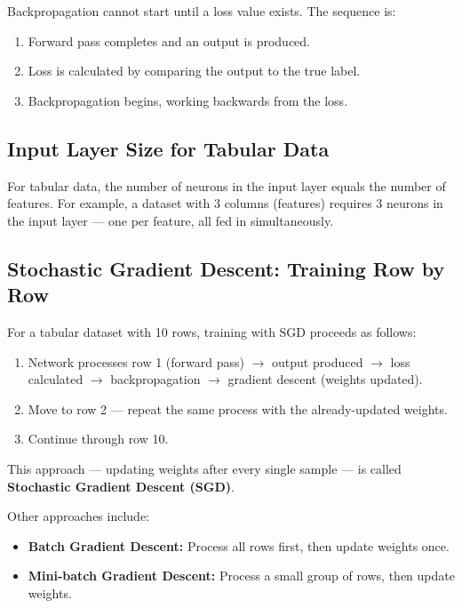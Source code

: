 \documentclass[12pt,a4paper]{article}
\begin{document}
Backpropagation cannot start until a loss value exists. The sequence is:

\begin{enumerate}
    \item Forward pass completes and an output is produced.
    \item Loss is calculated by comparing the output to the true label.
    \item Backpropagation begins, working backwards from the loss.
\end{enumerate}

\subsection{Input Layer Size for Tabular Data}

For tabular data, the number of neurons in the input layer equals the number of features.
For example, a dataset with 3 columns (features) requires 3 neurons in the input layer
--- one per feature, all fed in simultaneously.

\subsection{Stochastic Gradient Descent: Training Row by Row}

For a tabular dataset with 10 rows, training with SGD proceeds as follows:

\begin{enumerate}
    \item Network processes row 1 (forward pass) $\to$ output produced $\to$ loss
          calculated $\to$ backpropagation $\to$ gradient descent (weights updated).
    \item Move to row 2 --- repeat the same process with the already-updated weights.
    \item Continue through row 10.
\end{enumerate}

This approach --- updating weights after every single sample --- is called
\textbf{Stochastic Gradient Descent (SGD)}.

Other approaches include:
\begin{itemize}
    \item \textbf{Batch Gradient Descent:} Process all rows first, then update weights
          once.
    \item \textbf{Mini-batch Gradient Descent:} Process a small group of rows, then
          update weights.
\end{itemize}
\end{document}
